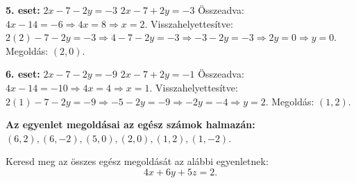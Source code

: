 \begin{solution}
	\textbf{5. eset:}
	$2x - 7 - 2y = -3$
	$2x - 7 + 2y = -3$
	Összeadva: $4x - 14 = -6 \Rightarrow 4x = 8 \Rightarrow x = 2$.
	Visszahelyettesítve: $2(2) - 7 - 2y = -3 \Rightarrow 4 - 7 - 2y = -3 \Rightarrow -3 - 2y = -3 \Rightarrow 2y = 0 \Rightarrow y = 0$.
	Megoldás: $(2, 0)$.
	
	\textbf{6. eset:}
	$2x - 7 - 2y = -9$
	$2x - 7 + 2y = -1$
	Összeadva: $4x - 14 = -10 \Rightarrow 4x = 4 \Rightarrow x = 1$.
	Visszahelyettesítve: $2(1) - 7 - 2y = -9 \Rightarrow -5 - 2y = -9 \Rightarrow -2y = -4 \Rightarrow y = 2$.
	Megoldás: $(1, 2)$.
	
	\textbf{Az egyenlet megoldásai az egész számok halmazán:}
	$(6, 2), (6, -2), (5, 0), (2, 0), (1, 2), (1, -2)$.
\end{solution}

\begin{extraproblem}
	Keresd meg az összes egész megoldását az alábbi egyenletnek:
	$$4x+6y+5z=2.$$
\end{extraproblem}


